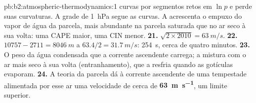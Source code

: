 \begin{solution}{pb:b2:atmospheric-thermodynamics:1}
curvas por segmentos retos em $\ln p$ e perde suas curvaturas. A grade de \qty{1}{hPa} segue as curvas. A 
acrescenta o empuxo do vapor de água da parcela, mais abundante na parcela saturada que no
ar seco à sua volta: uma CAPE maior, uma CIN menor.
\textbf{21.} $\sqrt{2 \times 2010} = \qty{63}{m/s}$.
\textbf{22.} $10757 - 2711 = \qty{8046}{m}$ a $63.4/2 = \qty{31.7}{m/s}$: \qty{254}{s}, cerca de quatro
minutos.
\textbf{23.} O peso da água condensada que a corrente ascendente carrega; a mistura com o ar mais seco
à sua volta (entranhamento), que a resfria quando as gotículas evaporam.
\textbf{24.} A teoria da parcela dá à corrente ascendente de uma tempestade alimentada por esse ar uma velocidade de cerca de
\textbf{\qty[text-series-to-math=true]{63}{m.s^{-1}}}, um limite superior.
\end{solution}
